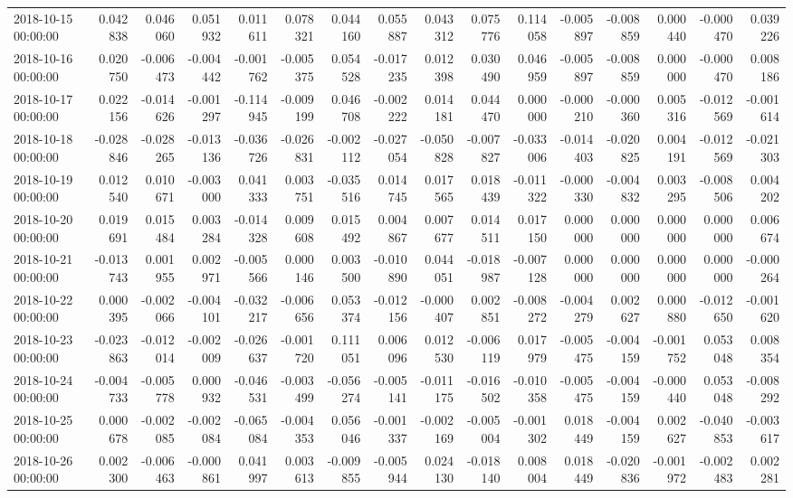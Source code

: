 \begin{tabular}{lrrrrrrrrrrrrrrr}
2018-10-15 00:00:00 & 0.042838 & 0.046060 & 0.051932 & 0.011611 & 0.078321 & 0.044160 & 0.055887 & 0.043312 & 0.075776 & 0.114058 & -0.005897 & -0.008859 & 0.000440 & -0.000470 & 0.039226 \\
2018-10-16 00:00:00 & 0.020750 & -0.006473 & -0.004442 & -0.001762 & -0.005375 & 0.054528 & -0.017235 & 0.012398 & 0.030490 & 0.046959 & -0.005897 & -0.008859 & 0.000000 & -0.000470 & 0.008186 \\
2018-10-17 00:00:00 & 0.022156 & -0.014626 & -0.001297 & -0.114945 & -0.009199 & 0.046708 & -0.002222 & 0.014181 & 0.044470 & 0.000000 & -0.000210 & -0.000360 & 0.005316 & -0.012569 & -0.001614 \\
2018-10-18 00:00:00 & -0.028846 & -0.028265 & -0.013136 & -0.036726 & -0.026831 & -0.002112 & -0.027054 & -0.050828 & -0.007827 & -0.033006 & -0.014403 & -0.020825 & 0.004191 & -0.012569 & -0.021303 \\
2018-10-19 00:00:00 & 0.012540 & 0.010671 & -0.003000 & 0.041333 & 0.003751 & -0.035516 & 0.014745 & 0.017565 & 0.018439 & -0.011322 & -0.000330 & -0.004832 & 0.003295 & -0.008506 & 0.004202 \\
2018-10-20 00:00:00 & 0.019691 & 0.015484 & 0.003284 & -0.014328 & 0.009608 & 0.015492 & 0.004867 & 0.007677 & 0.014511 & 0.017150 & 0.000000 & 0.000000 & 0.000000 & 0.000000 & 0.006674 \\
2018-10-21 00:00:00 & -0.013743 & 0.001955 & 0.002971 & -0.005566 & 0.000146 & 0.003500 & -0.010890 & 0.044051 & -0.018987 & -0.007128 & 0.000000 & 0.000000 & 0.000000 & 0.000000 & -0.000264 \\
2018-10-22 00:00:00 & 0.000395 & -0.002066 & -0.004101 & -0.032217 & -0.006656 & 0.053374 & -0.012156 & -0.000407 & 0.002851 & -0.008272 & -0.004279 & 0.002627 & 0.000880 & -0.012650 & -0.001620 \\
2018-10-23 00:00:00 & -0.023863 & -0.012014 & -0.002009 & -0.026637 & -0.001720 & 0.111051 & 0.006096 & 0.012530 & -0.006119 & 0.017979 & -0.005475 & -0.004159 & -0.001752 & 0.053048 & 0.008354 \\
2018-10-24 00:00:00 & -0.004733 & -0.005778 & 0.000932 & -0.046531 & -0.003499 & -0.056274 & -0.005141 & -0.011175 & -0.016502 & -0.010358 & -0.005475 & -0.004159 & -0.000440 & 0.053048 & -0.008292 \\
2018-10-25 00:00:00 & 0.000678 & -0.002085 & -0.002084 & -0.065084 & -0.004353 & 0.056046 & -0.001337 & -0.002169 & -0.005004 & -0.001302 & 0.018449 & -0.004159 & 0.002627 & -0.040853 & -0.003617 \\
2018-10-26 00:00:00 & 0.002300 & -0.006463 & -0.000861 & 0.041997 & 0.003613 & -0.009855 & -0.005944 & 0.024130 & -0.018140 & 0.008004 & 0.018449 & -0.020836 & -0.001972 & -0.002483 & 0.002281 \\

\end{tabular}
